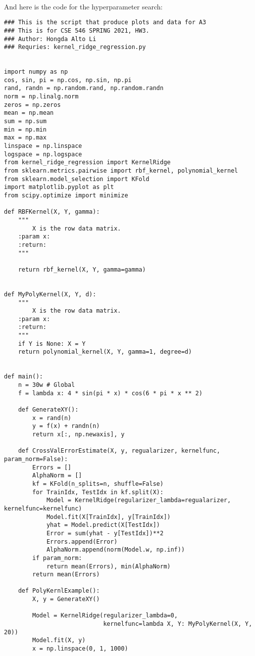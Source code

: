 \documentclass[]{article}
\begin{document}
        \\
        And here is the code for the hyperparameter search: 
        \begin{lstlisting}
### This is the script that produce plots and data for A3
### This is for CSE 546 SPRING 2021, HW3.
### Author: Hongda Alto Li
### Requries: kernel_ridge_regression.py


import numpy as np
cos, sin, pi = np.cos, np.sin, np.pi
rand, randn = np.random.rand, np.random.randn
norm = np.linalg.norm
zeros = np.zeros
mean = np.mean
sum = np.sum
min = np.min
max = np.max
linspace = np.linspace
logspace = np.logspace
from kernel_ridge_regression import KernelRidge
from sklearn.metrics.pairwise import rbf_kernel, polynomial_kernel
from sklearn.model_selection import KFold
import matplotlib.pyplot as plt
from scipy.optimize import minimize

def RBFKernel(X, Y, gamma):
    """
        X is the row data matrix.
    :param x:
    :return:
    """

    return rbf_kernel(X, Y, gamma=gamma)


def MyPolyKernel(X, Y, d):
    """
        X is the row data matrix.
    :param x:
    :return:
    """
    if Y is None: X = Y
    return polynomial_kernel(X, Y, gamma=1, degree=d)


def main():
    n = 30w # Global
    f = lambda x: 4 * sin(pi * x) * cos(6 * pi * x ** 2)

    def GenerateXY():
        x = rand(n)
        y = f(x) + randn(n)
        return x[:, np.newaxis], y

    def CrossValErrorEstimate(X, y, regualarizer, kernelfunc, param_norm=False):
        Errors = []
        AlphaNorm = []
        kf = KFold(n_splits=n, shuffle=False)
        for TrainIdx, TestIdx in kf.split(X):
            Model = KernelRidge(regularizer_lambda=regualarizer, kernelfunc=kernelfunc)
            Model.fit(X[TrainIdx], y[TrainIdx])
            yhat = Model.predict(X[TestIdx])
            Error = sum(yhat - y[TestIdx])**2
            Errors.append(Error)
            AlphaNorm.append(norm(Model.w, np.inf))
        if param_norm:
            return mean(Errors), min(AlphaNorm)
        return mean(Errors)

    def PolyKernlExample():
        X, y = GenerateXY()

        Model = KernelRidge(regularizer_lambda=0,
                            kernelfunc=lambda X, Y: MyPolyKernel(X, Y, 20))
        Model.fit(X, y)
        x = np.linspace(0, 1, 1000)


\end{lstlisting}
\end{document}
